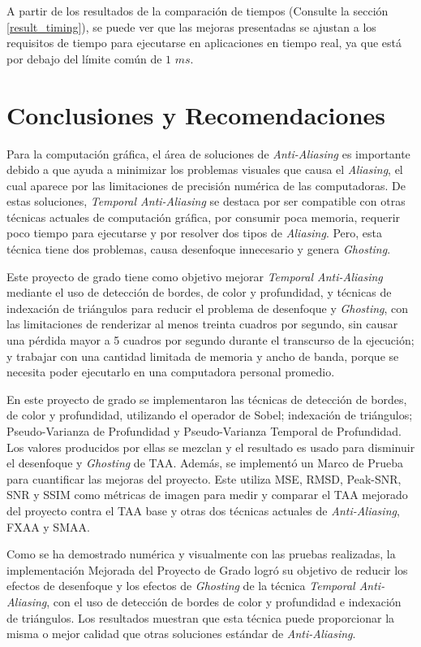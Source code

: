 \documentclass[pregrado]{tesis-usb} %
\begin{document}
A partir de los resultados de la comparación de tiempos (Consulte la sección \ref{result_timing}), se puede ver que las mejoras presentadas se ajustan a los requisitos de tiempo para ejecutarse en aplicaciones en tiempo real, ya que está por debajo del límite común de $1$ $ms$.


\chapter{Conclusiones y Recomendaciones}
Para la computación gráfica, el área de soluciones de \textit{Anti-Aliasing} es importante debido a que ayuda a minimizar  los problemas visuales que causa el \textit{Aliasing},  el cual aparece por las limitaciones de precisión numérica de las computadoras. De estas soluciones, \textit{Temporal Anti-Aliasing} se destaca por ser compatible con otras técnicas actuales de computación gráfica, por consumir poca memoria, requerir poco tiempo para ejecutarse y por resolver dos tipos de \textit{Aliasing}. Pero, esta técnica tiene dos problemas, causa desenfoque innecesario y genera \textit{Ghosting}. 

Este proyecto de grado tiene como objetivo mejorar \textit{Temporal Anti-Aliasing} mediante el uso de detección de bordes, de color y profundidad, y técnicas de indexación de triángulos para reducir el problema de desenfoque y \textit{Ghosting}, con las limitaciones de renderizar al menos treinta cuadros por segundo, sin causar una pérdida mayor a 5 cuadros por segundo durante el transcurso de la ejecución; y trabajar con una cantidad limitada de memoria y ancho de banda, porque se necesita poder ejecutarlo en una computadora personal promedio.

En este proyecto de grado se implementaron las técnicas de detección de bordes, de color y profundidad, utilizando el operador de Sobel; indexación de triángulos; Pseudo-Varianza de Profundidad y Pseudo-Varianza Temporal de Profundidad. Los valores producidos por ellas se mezclan y el resultado es usado para disminuir el desenfoque y \textit{Ghosting} de TAA. Además, se implementó un Marco de Prueba para cuantificar las mejoras del proyecto. Este utiliza MSE, RMSD, Peak-SNR, SNR y SSIM como métricas de imagen para medir y comparar el TAA mejorado del proyecto contra el TAA base y otras dos técnicas actuales de \textit{Anti-Aliasing}, FXAA y SMAA.

Como se ha demostrado numérica y visualmente con las pruebas realizadas, la implementación Mejorada del Proyecto de Grado logró su objetivo de reducir los efectos de desenfoque y los efectos de \textit{Ghosting} de la técnica \textit{Temporal Anti-Aliasing}, con el uso de detección de bordes de color y profundidad e indexación de triángulos. Los resultados muestran que esta técnica puede proporcionar la misma o mejor calidad que otras soluciones estándar de \textit{Anti-Aliasing}. 
\end{document}
